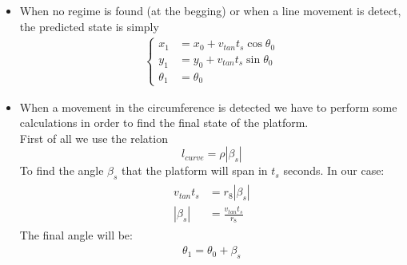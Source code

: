 \begin{itemize}
\item When no regime is found (at the begging) or when a line movement is detect, the predicted state is simply
\begin{align}
\begin{cases}
x_1 &= x_0 + v_{tan}t_s\cos{\theta_0}\\
y_1 &= y_0 + v_{tan}t_s\sin{\theta_0}\\
\theta_1 &= \theta_0
\end{cases}
\label{eq:line_future_pose}
\end{align}
\item When a movement in the circumference is detected we have to perform some calculations in order to find the final state of the platform.\\ 
First of all we use the relation 
$$l_{curve} = \rho|\beta_s|$$ 
To find the angle $\beta_s$ that the platform will span in $t_s$ seconds. In our case:
\begin{align}
\begin{split}
v_{tan}t_s &= r_8| \beta_{s}|\\
|\beta_{s}| &= \frac{v_{tan}t_s}{r_8}
\end{split}
 \label{eq:anglespanned}
\end{align}
The final angle will be:
 \begin{align}
 \theta_1 = \theta_0 + \beta_s
 \label{eq:anglefinal}
 \end{align}



\end{itemize}
